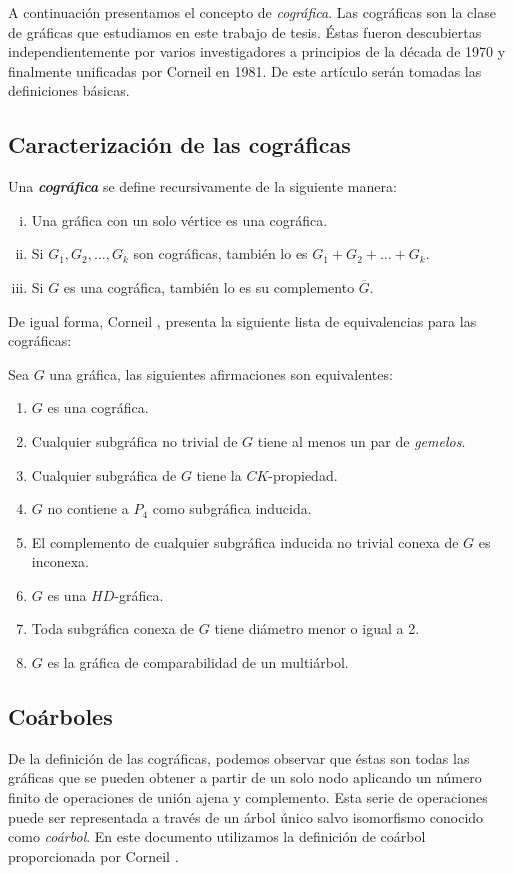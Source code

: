 A continuación presentamos el concepto de \emph{cográfica}. Las cográficas son la clase de gráficas que estudiamos en este trabajo de tesis. Éstas fueron descubiertas independientemente por varios investigadores a principios de la década de 1970 y finalmente unificadas por Corneil en 1981\cite{Corneil}. De este artículo serán tomadas las definiciones básicas.

\subsection{Caracterización de las cográficas}

Una \emph{\textbf{cográfica}} se define recursivamente de la siguiente manera:

\begin{enumerate}[(i)]
    \item Una gráfica con un solo vértice es una cográfica.
    \item Si $G_1, G_2, \dots, G_k$ son cográficas, también lo es $G_1 + G_2 + \dots + G_k$.
    \item Si $G$ es una cográfica, también lo es su complemento $\overline{G}$.
\end{enumerate}

De igual forma, Corneil \cite{Corneil}, presenta la siguiente lista de equivalencias para las cográficas:

Sea $G$ una gráfica, las siguientes afirmaciones son equivalentes:

\begin{enumerate}[(1)]
    \item $G$ es una cográfica.
    \item Cualquier subgráfica no trivial de $G$ tiene al menos un par de \emph{gemelos}.
    \item Cualquier subgráfica de $G$ tiene la $CK$-propiedad.
    \item $G$ no contiene a $P_4$ como subgráfica inducida.
    \item El complemento de cualquier subgráfica inducida no trivial conexa de $G$ es inconexa.
    \item $G$ es una $HD$-gráfica.
    \item Toda subgráfica conexa de $G$ tiene diámetro menor o igual a 2.
    \item $G$ es la gráfica de comparabilidad de un multiárbol.
\end{enumerate}

\subsection{Coárboles}
 De la definición de las cográficas, podemos observar que éstas son todas las gráficas que se pueden obtener a partir de un solo nodo aplicando un número finito de operaciones de unión ajena y complemento. Esta serie de operaciones puede ser representada a través de un árbol único salvo isomorfismo conocido como \emph{coárbol}. En este documento utilizamos la definición de coárbol proporcionada por Corneil \cite{Corneil02}.

